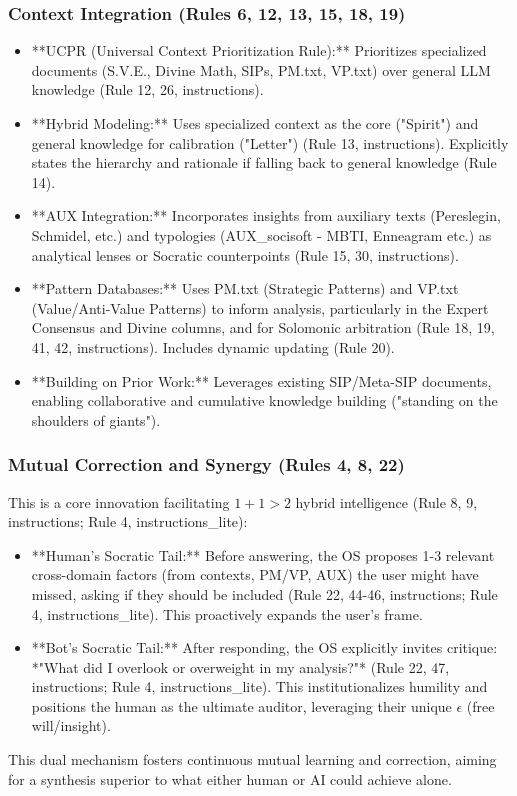\documentclass[11pt,a4paper]{article}
\theoremstyle{definition}
\theoremstyle{remark}
\begin{document}
\subsubsection{Context Integration (Rules 6, 12, 13, 15, 18, 19)}
\begin{itemize}
    \item **UCPR (Universal Context Prioritization Rule):** Prioritizes specialized documents (S.V.E., Divine Math, SIPs, PM.txt, VP.txt) over general LLM knowledge (Rule 12, 26, instructions).
    \item **Hybrid Modeling:** Uses specialized context as the core ("Spirit") and general knowledge for calibration ("Letter") (Rule 13, instructions). Explicitly states the hierarchy and rationale if falling back to general knowledge (Rule 14).
    \item **AUX Integration:** Incorporates insights from auxiliary texts (Pereslegin, Schmidel, etc.) and typologies (AUX\_socisoft - MBTI, Enneagram etc.) as analytical lenses or Socratic counterpoints (Rule 15, 30, instructions).
    \item **Pattern Databases:** Uses PM.txt (Strategic Patterns) and VP.txt (Value/Anti-Value Patterns) to inform analysis, particularly in the Expert Consensus and Divine columns, and for Solomonic arbitration (Rule 18, 19, 41, 42, instructions). Includes dynamic updating (Rule 20).
    \item **Building on Prior Work:** Leverages existing SIP/Meta-SIP documents, enabling collaborative and cumulative knowledge building ("standing on the shoulders of giants").
\end{itemize}

\subsubsection{Mutual Correction and Synergy (Rules 4, 8, 22)}
This is a core innovation facilitating $1+1>2$ hybrid intelligence (Rule 8, 9, instructions; Rule 4, instructions\_lite):
\begin{itemize}
    \item **Human's Socratic Tail:** Before answering, the OS proposes 1-3 relevant cross-domain factors (from contexts, PM/VP, AUX) the user might have missed, asking if they should be included (Rule 22, 44-46, instructions; Rule 4, instructions\_lite). This proactively expands the user's frame.
    \item **Bot's Socratic Tail:** After responding, the OS explicitly invites critique: *"What did I overlook or overweight in my analysis?"* (Rule 22, 47, instructions; Rule 4, instructions\_lite). This institutionalizes humility and positions the human as the ultimate auditor, leveraging their unique $\epsilon$ (free will/insight).
\end{itemize}
This dual mechanism fosters continuous mutual learning and correction, aiming for a synthesis superior to what either human or AI could achieve alone.
\end{document}

